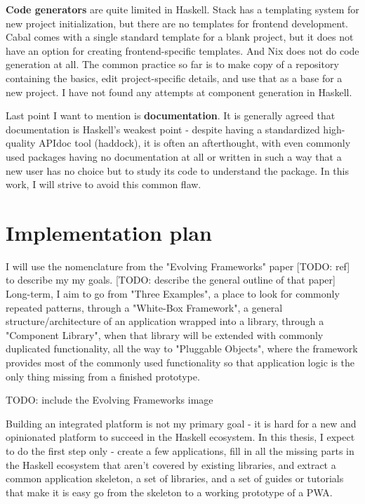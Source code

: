 \documentclass[english,odsaz]{fitthesis}
\begin{document}
\textbf{Code generators} are quite limited in Haskell. Stack has a templating system for
new project initialization, but there are no templates for frontend development.
Cabal comes with a single standard template for a blank project, but it does not
have an option for creating frontend-specific templates. And Nix does not do
code generation at all. The common practice so far is to make copy of a
repository containing the basics, edit project-specific details, and use that as
a base for a new project. I have not found any attempts at component generation
in Haskell.

Last point I want to mention is \textbf{documentation}. It is generally agreed that
documentation is Haskell's weakest point - despite having a standardized
high-quality APIdoc tool (haddock), it is often an afterthought, with even
commonly used packages having no documentation at all or written in such a way
that a new user has no choice but to study its code to understand the
package. In this work, I will strive to avoid this common flaw.

\section{Implementation plan}
\label{sec:org80ac1a6}
I will use the nomenclature from the "Evolving Frameworks" paper [TODO: ref] to
describe my my goals. [TODO: describe the general outline of that paper]
Long-term, I aim to go from "Three Examples", a place to look for commonly
repeated patterns, through a "White-Box Framework", a general
structure/architecture of an application wrapped into a library, through a
"Component Library", when that library will be extended with commonly duplicated
functionality, all the way to "Pluggable Objects", where the framework provides
most of the commonly used functionality so that application logic is the only
thing missing from a finished prototype.

TODO: include the Evolving Frameworks image

Building an integrated platform is not my primary goal - it is hard for a new
and opinionated platform to succeed in the Haskell ecosystem. In this thesis, I
expect to do the first step only - create a few applications, fill in all the
missing parts in the Haskell ecosystem that aren't covered by existing
libraries, and extract a common application skeleton, a set of libraries, and a
set of guides or tutorials that make it is easy go from the skeleton to a
working prototype of a PWA.
\end{document}
